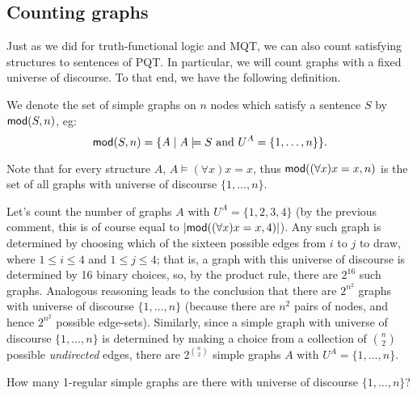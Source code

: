\subsection*{Counting graphs}

Just as we did for truth-functional logic and MQT, we can also count satisfying structures to sentences of PQT. In particular, we will count graphs with a fixed universe of discourse. To that end, we have the following definition. 

\begin{definition}
We denote the set of simple graphs on $n$ nodes which satisfy a sentence $S$ by $\mbox{$\mathsf {mod}(S,n)$}$, eg: \[\mbox{$\mathsf {mod}(S,n)$}=\{A\mid A\models S\mbox{ and }U^A=\{1,\ldots,n\}\}.\] 
\end{definition}

Note that for every structure $A$, $A\models (\forall x)x=x$, thus  $\mbox{$\mathsf {mod}((\forall x)x=x,n)$}$ is the set of all graphs with universe of discourse $\{1,\ldots,n\}$. 

Let's count the number of graphs $A$ with $U^A=\{1,2,3,4\}$ (by the previous comment, this is of course equal to $\mbox{$|\mbox{$\mathsf {mod}((\forall x)x=x,4)$}|$}$). Any such graph is determined by choosing which of the sixteen possible edges from $i$ to $j$ to draw, where $1\leq i\leq 4$ and $1\leq j\leq 4$; that is, a graph with this universe of discourse is determined by 16 binary choices, so, by the product rule, there are $2^{16}$ such graphs. Analogous reasoning leads to the conclusion that there are $2^{n^2}$ graphs with universe of discourse $\{1,\ldots, n\}$ (because there are $n^2$ pairs of nodes, and hence $2^{n^2}$ possible edge-sets). Similarly, since a simple graph with universe of discourse $\{1,\ldots, n\}$ is determined by making a choice from a collection of $\binom{n}{2}$ possible \emph{undirected} edges, there are $2^{\binom{n}{2}}$ simple graphs $A$ with $U^A=\{1,\ldots, n\}$. 

\begin{aside}
    How many 1-regular simple graphs are there with universe of discourse $\{1,\ldots, n\}$? 
\end{aside}